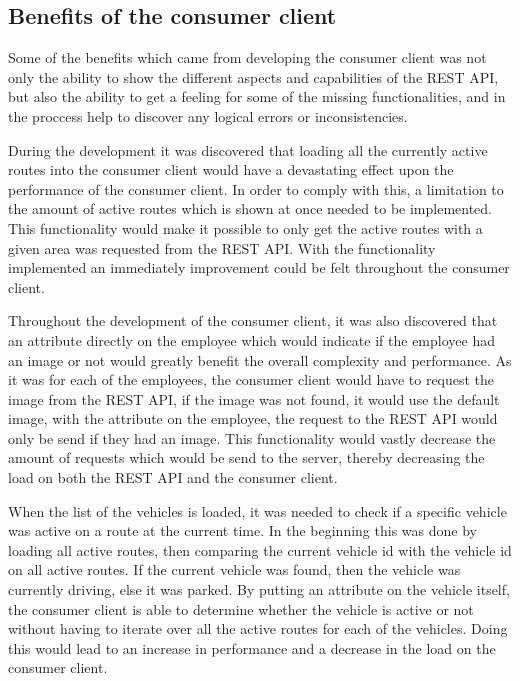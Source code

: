 \subsection{Benefits of the consumer client}\label{ssec:benefits_consumer_client}
Some of the benefits which came from developing the consumer client was not only the ability to show the different aspects and capabilities of the REST API, but also the ability to get a feeling for some of the missing functionalities, and in the proccess help to discover any logical errors or inconsistencies.

\bigskip
{}
During the development it was discovered that loading all the currently active routes into the consumer client would have a devastating effect upon the performance of the consumer client.
In order to comply with this, a limitation to the amount of active routes which is shown at once needed to be implemented.
This functionality would make it possible to only get the active routes with a given area was requested from the REST API.
With the functionality implemented an immediately improvement could be felt throughout the consumer client.

\bigskip
{}
Throughout the development of the consumer client, it was also discovered that an attribute directly on the employee which would indicate if the employee had an image or not would greatly benefit the overall complexity and performance.
As it was for each of the employees, the consumer client would have to request the image from the REST API, if the image was not found, it would use the default image, with the attribute on the employee, the request to the REST API would only be send if they had an image.
This functionality would vastly decrease the amount of requests which would be send to the server, thereby decreasing the load on both the REST API and the consumer client.

\bigskip
{}
When the list of the vehicles is loaded, it was needed to check if a specific vehicle was active on a route at the current time.
In the beginning this was done by loading all active routes, then comparing the current vehicle id with the vehicle id on all active routes.
If the current vehicle was found, then the vehicle was currently driving, else it was parked.
By putting an attribute on the vehicle itself, the consumer client is able to determine whether the vehicle is active or not without having to iterate over all the active routes for each of the vehicles.
Doing this would lead to an increase in performance and a decrease in the  load on the consumer client.

